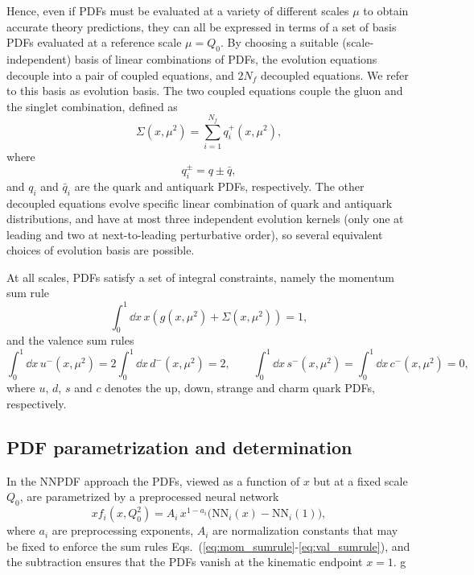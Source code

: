 \documentclass[11pt,a4paper]{article}
\begin{document}
Hence, even if PDFs must be evaluated at a variety of different scales $\mu$ to obtain accurate theory predictions, they can all be expressed in terms of a set of basis PDFs evaluated at a reference scale $\mu=Q_0$. 
By choosing a suitable (scale-independent) basis of linear combinations of PDFs, the evolution equations decouple into a pair of coupled equations, and $2N_f$ decoupled equations. We refer to this basis as evolution basis. The two coupled equations couple the gluon and the singlet combination, defined as
%
\begin{equation}\label{eq:singlet}
\Sigma(x,\mu^2)=\sum_{i=1}^{N_f} q^+_i(x,\mu^2), 
\end{equation}
%
where
%
\begin{equation}\label{eq:qpm}
q_i^\pm= q\pm \bar q,
\end{equation}
%
and $q_i$ and $\bar q_i$ are the quark and antiquark PDFs, respectively. The other decoupled equations evolve specific linear combination of quark and antiquark distributions, and have at most three independent evolution kernels (only one at leading and two at next-to-leading perturbative order), so several equivalent choices of evolution basis are possible.

At all scales, PDFs satisfy a set of integral constraints, namely the momentum sum rule
%
\begin{equation}
\label{eq:mom_sumrule}
    \int_0^1 \dd x\, x\left(g(x,\mu^2)+ \Sigma(x,\mu^2)\right)=1,
\end{equation}
%
and the valence sum rules
%
\begin{equation}
\label{eq:val_sumrule}
    \int_0^1 \dd x\, u^-(x,\mu^2) = 2\int_0^1 \dd x\, d^-(x,\mu^2)=2,\qquad  \int_0^1 \dd x\, s^-(x,\mu^2) = \int_0^1 \dd x\, c^-(x,\mu^2)=0,
\end{equation}
%
where $u$, $d$, $s$ and $c$ denotes the up, down, strange and charm quark PDFs, respectively.

\subsection{PDF parametrization and determination}
\label{sec:pardet}

In the NNPDF approach the PDFs, viewed as a function of $x$ but at a fixed scale $Q_0$, are parametrized by a preprocessed neural network
%
\begin{equation}
\label{eq:PDF}
  x f_i(x, Q^2_0) = A_i\, x^{1-a_i} 
  \bigl(\text{NN}_i(x)-\text{NN}_i(1)\bigr),
\end{equation}
%
where $a_i$ are preprocessing exponents, $A_i$ are normalization constants that may be fixed to enforce the sum rules Eqs.~(\ref{eq:mom_sumrule}-\ref{eq:val_sumrule}), and the subtraction ensures that the PDFs vanish at the kinematic endpoint $x=1$. g
\end{document}
